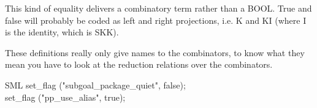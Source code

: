 This kind of equality delivers a combinatory term rather than a BOOL.
True and false will probably be coded as left and right projections, i.e. K and KI (where I is the identity, which is SKK).

These definitions really only give names to the combinators, to know what they mean you have to look at the reduction relations over the combinators.

\begin{GFT}{SML}
\+set\_flag ("subgoal\_package\_quiet", false);\\
\+set\_flag ("pp\_use\_alias", true);\\
\end{GFT}



